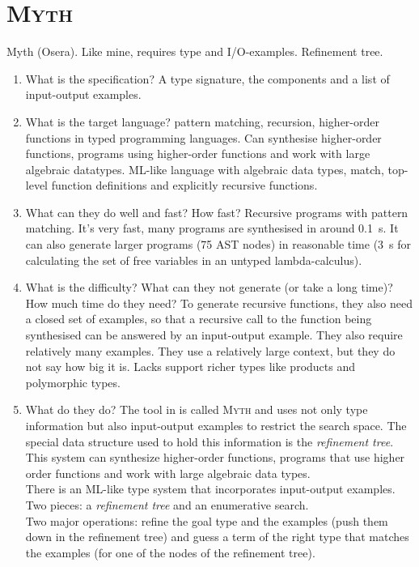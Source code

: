 \section{\mdseries\textsc{Myth}}
Myth (Osera). Like mine, requires type and I/O-examples. Refinement tree.
\begin{enumerate}
\item What is the specification?
A type signature, the components and a list of input-output examples.
\item What is the target language?
pattern matching, recursion, higher-order functions in typed programming languages. Can synthesise higher-order functions, programs using higher-order functions and work with large algebraic datatypes.
ML-like language with algebraic data types, match, top-level function definitions and explicitly recursive functions.
\item What can they do well and fast? How fast?
Recursive programs with pattern matching. It's very fast, many programs are synthesised in around 0.1~s. It can also generate larger programs (75 AST nodes) in reasonable time (3~s for calculating the set of free variables in an untyped lambda-calculus).
\item What is the difficulty? What can they not generate (or take a long time)? How much time do they need?
To generate recursive functions, they also need a closed set of examples, so that a recursive call to the function being synthesised can be answered by an input-output example. They also require relatively many examples. They use a relatively large context, but they do not say how big it is.
Lacks support richer types like products and polymorphic types.
\item What do they do?
The tool in \cite{MythPaper} is called \textsc{Myth} and uses not only type information but also input-output examples to restrict the search space. The special data structure used to hold this information is the \emph{refinement tree}. This system can synthesize higher-order functions, programs that use higher order functions and work with large algebraic data types.\\
There is an ML-like type system that incorporates input-output examples. Two pieces: a \emph{refinement tree} and an enumerative search.\\
Two major operations: refine the goal type and the examples (push them down in the refinement tree) and guess a term of the right type that matches the examples (for one of the nodes of the refinement tree).\\
\end{enumerate}





